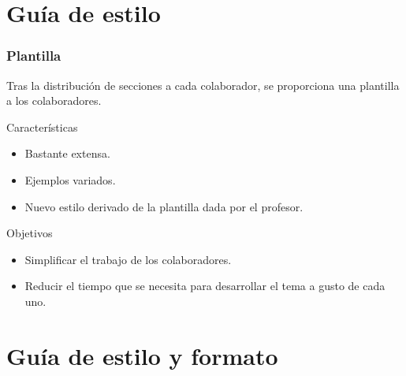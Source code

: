\documentclass[9pt,xcolor=svgnames]{beamer}
\begin{document}
  
 \section{Guía de estilo}

 \begin{frame}
  \frametitle{Plantilla}

  \transdissolve
   Tras la distribución de secciones a cada colaborador, se proporciona una
   plantilla a los colaboradores.
  
  \begin{block}{Características}
    \begin{itemize}
    \item Bastante extensa.
    \item Ejemplos variados.
    \item Nuevo estilo derivado de la plantilla dada por el profesor.    
    \end{itemize}
  \end{block}
  
  \begin{block}{Objetivos}
  \begin{itemize}
    \item Simplificar el trabajo de los colaboradores.
    \item Reducir el tiempo que se necesita para desarrollar el tema a 
    gusto de cada uno.  
  \end{itemize}
  \end{block}
 
  \end{frame}
   
 
 \section{Guía de estilo y formato}
 
\end{document}
